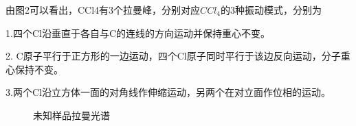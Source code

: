\documentclass{article}
\begin{document}
由图2可以看出，CCl4有3个拉曼峰，分别对应$ CCl_4 $的3种振动模式，分别为


1.四个Cl沿垂直于各自与C的连线的方向运动并保持重心不变。


2. C原子平行于正方形的一边运动，四个Cl原子同时平行于该边反向运动，分子重心保持不变。


3.两个Cl沿立方体一面的对角线作伸缩运动，另两个在对立面作位相的运动。
	
	
	\begin{figure}[!h]
		\centering
		
		
		\caption{\heiti{}未知样品拉曼光谱}
		
	\end{figure}
\end{document}

